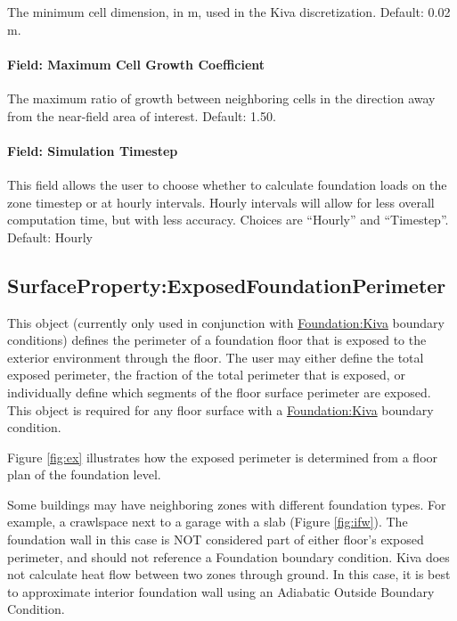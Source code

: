 The minimum cell dimension, in m, used in the Kiva discretization.
Default: 0.02 m.

\paragraph{Field: Maximum Cell Growth Coefficient}\label{foundation-kiva-settings-maximum-cell-growth-coefficient}

The maximum ratio of growth between neighboring cells in the direction
away from the near-field area of interest. Default: 1.50.

\paragraph{Field: Simulation Timestep}\label{foundation-kiva-settings-simulation-timestep}

This field allows the user to choose whether to calculate foundation
loads on the zone timestep or at hourly intervals. Hourly intervals will
allow for less overall computation time, but with less accuracy. Choices
are ``Hourly'' and ``Timestep''. Default: Hourly

\subsection{SurfaceProperty:ExposedFoundationPerimeter}\label{surfaceproperty-exposedfoundationperimeter}

This object (currently only used in conjunction with \hyperref[foundationkiva]{Foundation:Kiva}
boundary conditions) defines the perimeter of a foundation floor that is
exposed to the exterior environment through the floor. The user may
either define the total exposed perimeter, the fraction of the total
perimeter that is exposed, or individually define which segments of the
floor surface perimeter are exposed. This object is required for any floor surface with a \hyperref[foundationkiva]{Foundation:Kiva} boundary condition.

Figure \ref{fig:ex} illustrates how the exposed perimeter is determined
from a floor plan of the foundation level.

Some buildings may have neighboring zones with different foundation
types. For example, a crawlspace next to a garage with a slab (Figure
\ref{fig:ifw}). The foundation wall in this case is NOT considered part
of either floor's exposed perimeter, and should not reference a
Foundation boundary condition. Kiva does not calculate heat flow between
two zones through ground. In this case, it is best to approximate
interior foundation wall using an Adiabatic Outside Boundary Condition.


